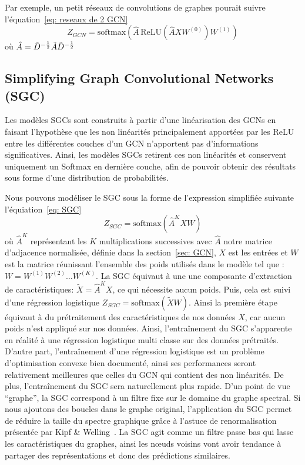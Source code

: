 \documentclass[a4paper]{article}
\begin{document}
Par exemple, un petit réseaux de convolutions de graphes pourait suivre l'équation~\ref{eq: reseaux de 2 GCN}
\begin{equation}
    Z_{GCN} = \text{softmax}(\hat{A}\,\text{ReLU}(\hat{A}XW^{(0)})W^{(1)})
    \label{eq: reseaux de 2 GCN}
\end{equation}
où $\hat{A} = \Tilde{D}^{-\frac{1}{2}} \Tilde{A} \Tilde{D}^{-\frac{1}{2}}$



\subsection{Simplifying Graph Convolutional Networks (SGC)}

Les modèles SGCs sont construits à partir d'une linéarisation des GCNs en faisant l'hypothèse que les non linéarités 
principalement apportées par les ReLU entre les différentes couches d'un GCN n'apportent pas d'informations significatives.
 Ainsi, les modèles SGCs retirent ces non linéarités et conservent uniquement un Softmax en dernière couche, afin de pouvoir 
 obtenir des résultats sous forme d'une distribution de probabilités.

Nous pouvons modéliser le SGC sous la forme de l'expression simplifiée suivante l'équiation~\ref{eq: SGC}
\begin{equation}
  Z_{SGC}=\text{softmax}(\hat{A}^KXW)
  \label{eq: SGC}
\end{equation}
où $\hat{A}^K$ représentant les $K$ multiplications successives avec $\hat{A}$ notre matrice d'adjacence normalisée,
définie dans la section~\ref{sec: GCN}, $X$ est les entrées 
et $W$ est la matrice réunissant l'ensemble des poids utilisés dans le modèle tel que : $W=W^{(1)} W^{(2)} \dots W^{(K)}$.
La SGC équivaut à une une composante d'extraction de caractéristiques: $\tilde{X}=\hat{A}^KX$, ce qui nécessite aucun 
poids. Puis, cela est suivi d'une régression logistique $Z_{SGC}=\text{softmax}(\tilde{X}W)$. Ainsi la première étape équivaut 
à du prétraitement des caractéristiques de nos données $X$, car aucun poids n'est appliqué sur nos données. Ainsi, l'entraînement
 du SGC s'apparente en réalité à une régression logistique multi classe sur des données prétraités. 
D'autre part, l'entraînement d'une régression logistique est un problème d'optimisation convexe bien documenté, ainsi ses 
performances seront relativement meilleures que celles du GCN qui contient des non linéarités. De plus, l'entraînement du 
SGC sera naturellement plus rapide.
D'un point de vue “graphe”, la SGC correspond à un filtre fixe sur le domaine du graphe spectral. Si nous ajoutons des boucles 
dans le graphe original, l'application du SGC permet de réduire la taille du spectre graphique grâce à l'astuce de renormalisation 
présentée par Kipf \& Welling~\cite{DBLP:journals/corr/KipfW16}. La SGC agit comme un filtre passe bas qui lasse les 
caractéristiques du graphes, ainsi les 
nœuds voisins vont avoir tendance à partager des représentations et donc des prédictions similaires. 
\end{document}

